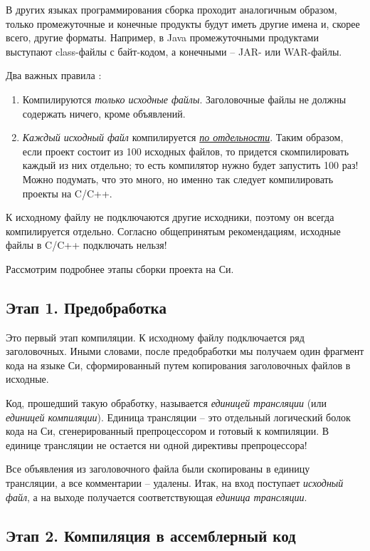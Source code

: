\documentclass[%
	11pt,
	a4paper,
	utf8,
		]{article}
\begin{document}
В других языках программирования сборка проходит аналогичным образом, только промежуточные и конечные продукты будут иметь другие имена и, скорее всего, другие форматы. Например, в Java промежуточными продуктами выступают class-файлы с байт-кодом, а конечными -- JAR- или WAR-файлы.

Два важных правила \cite[]{amini-extreme-c:2022}:
\begin{enumerate}
	\item Компилируются \emph{только исходные файлы}. Заголовочные файлы не должны содержать ничего, кроме объявлений. 
	
	\item \emph{Каждый исходный файл} компилируется \underline{\itshape по отдельности}. Таким образом, если проект состоит из 100 исходных файлов, то придется скомпилировать каждый из них отдельно; то есть компилятор нужно будет запустить 100 раз! Можно подумать, что это много, но именно так следует компилировать проекты на C/C++. 
\end{enumerate}

К исходному файлу не подключаются другие исходники, поэтому он всегда компилируется отдельно. Согласно общепринятым рекомендациям, исходные файлы в C/C++ подключать нельзя!

Рассмотрим подробнее этапы сборки проекта на Си.

\subsection{Этап 1. Предобработка}

Это первый этап компиляции. К исходному файлу подключается ряд заголовочных. Иными словами, после предобработки мы получаем один фрагмент кода на языке Си, сформированный путем копирования заголовочных файлов в исходные.

Код, прошедший такую обработку, называется \emph{единицей трансляции} (или \emph{единицей компиляции}). Единица трансляции -- это отдельный логический болок кода на Си, сгенерированный препроцессором и готовый к компиляции. В единице трансляции не остается ни одной директивы препроцессора!

Все объявления из заголовочного файла были скопированы в единицу трансляции, а все комментарии -- удалены. Итак, на вход поступает \emph{исходный файл}, а на выходе получается соответствующая \emph{единица трансляции}.

\subsection{Этап 2. Компиляция в ассемблерный код}
\end{document}
